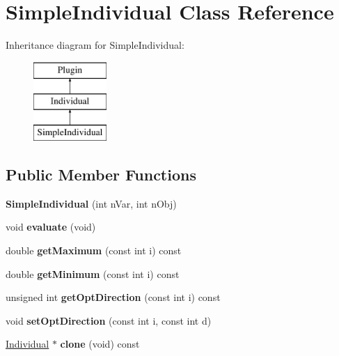 \hypertarget{classSimpleIndividual}{}\section{Simple\+Individual Class Reference}
\label{classSimpleIndividual}
Inheritance diagram for Simple\+Individual\+:\begin{figure}[H]
\begin{center}
\leavevmode
\includegraphics[height=3.000000cm]{d3/da8/classSimpleIndividual}
\end{center}
\end{figure}
\subsection*{Public Member Functions}
\begin{DoxyCompactItemize}
\item 
\mbox{\label{classSimpleIndividual_a120e65e839faa693d8ad12d08c8b476a}} 
{\bfseries Simple\+Individual} (int n\+Var, int n\+Obj)
\item 
\mbox{\label{classSimpleIndividual_aad10ed7c1037417d8a1c48ad794d4068}} 
void {\bfseries evaluate} (void)
\item 
\mbox{\label{classSimpleIndividual_ac28c4bb3a587763fc0b6264cb3c87479}} 
double {\bfseries get\+Maximum} (const int i) const
\item 
\mbox{\label{classSimpleIndividual_ae35587cc860f4281ed4f2f0e196a58f4}} 
double {\bfseries get\+Minimum} (const int i) const
\item 
\mbox{\label{classSimpleIndividual_ab7b07fd70f90fa024179ed05b26ea2f7}} 
unsigned int {\bfseries get\+Opt\+Direction} (const int i) const
\item 
\mbox{\label{classSimpleIndividual_af6d469ce795e3862d62b90d97b32d50a}} 
void {\bfseries set\+Opt\+Direction} (const int i, const int d)
\item 
\mbox{\label{classSimpleIndividual_ab13d92d0525fa23289fe99fc25954e12}} 
\mbox{\hyperlink{classIndividual}{Individual}} $\ast$ {\bfseries clone} (void) const
\end{DoxyCompactItemize}
